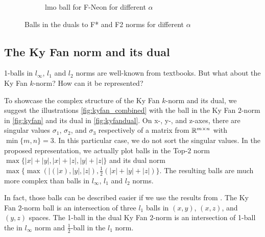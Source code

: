 \documentclass{article} %
\newcommand{\abs}[1]{\lvert #1 \rvert}
\newcommand{\Rmn}{\R^{m\times n}}
\begin{document}
\begin{figure}[h!]
\begin{subfigure}[b]{0.48\linewidth}
        \caption{lmo ball for F-Neon for different $\alpha$}
        \label{fig:ftwodual}
    \end{subfigure}
    \caption{Balls in the duals to F* and F2 norms for different $\alpha$}
    \label{fig:fduals}
\end{figure}

\subsection{The Ky Fan norm and its dual}
1-balls in $l_\infty$, $l_1$ and $l_2$ norms are well-known from textbooks. But what about the Ky Fan $k$-norm? How can it be represented?

To showcase the complex structure of the Ky Fan $k$-norm and its dual, we suggest the illustrations \cref{fig:kyfan_combined} with the ball in the Ky Fan $2$-norm in \cref{fig:kyfan} and its dual in \cref{fig:kyfandual}. On x-, y-, and z-axes, there are singular values $\sigma_1$, $\sigma_2$, and $\sigma_3$ respectively of a matrix from $\Rmn$ with $\min\{m,n\}=3$. In this particular case, we do not sort the singular values. In the proposed representation, we actually plot balls in the Top-$2$ norm $\max\{\abs{x}+\abs{y}, \abs{x}+\abs{z}, \abs{y}+\abs{z}\}$ and its dual norm $\max\{\max(\abs(x),\abs{y},\abs{z}), \frac{1}{2} (\abs{x}+\abs{y}+\abs{z})\}$. The resulting balls are much more complex than balls in $l_\infty$, $l_1$ and $l_2$ norms.

In fact, those balls can be described easier if we use the results from \citet{yu2012arithmetic}. The Ky Fan $2$-norm ball is an intersection of three $l_1$ balls in $(x,y)$, $(x, z)$, and $(y,z)$ spaces. The 1-ball in the dual Ky Fan $2$-norm is an intersection of 1-ball the in $l_\infty$ norm and $\frac{1}{2}$-ball in the $l_1$ norm.
\end{document}
